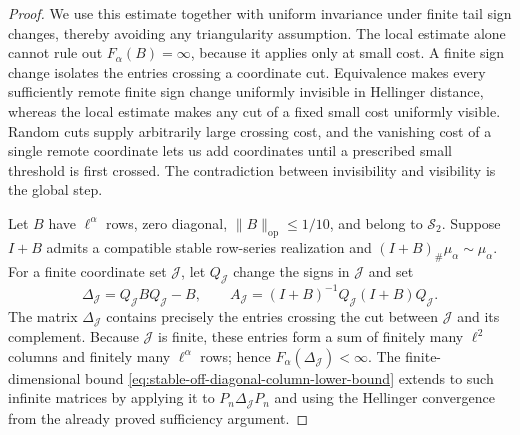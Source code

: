 \begin{proof}
We use this estimate together with uniform invariance under finite tail sign
changes, thereby avoiding any triangularity assumption.
The local estimate alone cannot rule out \(F_\alpha(B)=\infty\), because it
applies only at small cost.  A finite sign change isolates the entries crossing
a coordinate cut.  Equivalence makes every sufficiently remote finite sign
change uniformly invisible in Hellinger distance, whereas the local estimate
makes any cut of a fixed small cost uniformly visible.  Random cuts supply
arbitrarily large crossing cost, and the vanishing cost of a single remote
coordinate lets us add coordinates until a prescribed small threshold is
first crossed.  The contradiction between invisibility and visibility is the
global step.

Let \(B\) have \(\ell^\alpha\) rows, zero diagonal,
\(\|B\|_{\mathrm{op}}\le1/10\), and belong to \(\mathcal S_2\).  Suppose
\(I+B\) admits a compatible stable row-series realization and
\((I+B)_\#\mu_\alpha\sim\mu_\alpha\).
For a finite coordinate set \(\mathcal J\), let \(Q_{\mathcal J}\) change
the signs in \(\mathcal J\)
and set
\[
 \Delta_{\mathcal J}=Q_{\mathcal J}BQ_{\mathcal J}-B,
 \qquad
 A_{\mathcal J}=(I+B)^{-1}Q_{\mathcal J}(I+B)Q_{\mathcal J}.
\]
The matrix \(\Delta_{\mathcal J}\) contains precisely the entries crossing
the cut between \(\mathcal J\) and its complement.
Because \(\mathcal J\) is finite, these entries form a sum of finitely many
\(\ell^2\) columns and finitely many \(\ell^\alpha\) rows; hence
\(F_\alpha(\Delta_{\mathcal J})<\infty\).
The finite-dimensional bound
\eqref{eq:stable-off-diagonal-column-lower-bound} extends to such infinite matrices by
applying it to \(P_n\Delta_{\mathcal J}P_n\) and using the Hellinger convergence from
the already proved sufficiency argument.


\end{proof}
